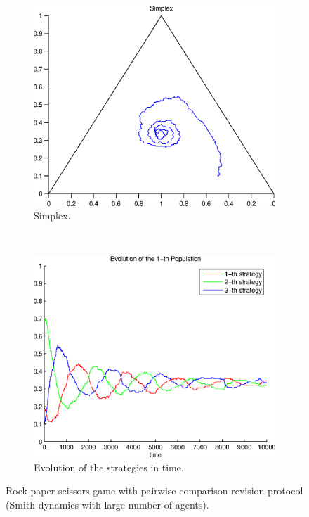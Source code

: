 \begin{figure}
  \centering
  \begin{subfigure}[b]{0.45\textwidth}
	  \includegraphics[width=\textwidth]{./images/test_finite_pairwise_comparison.eps}
	  \caption{Simplex.}
	  \label{fig:finite3_simplex}
  \end{subfigure}
  ~ 
  \begin{subfigure}[b]{0.45\textwidth}
	  \includegraphics[width=\textwidth]{./images/test_finite_pairwise_comparison_ev.eps}
	  \caption{Evolution of the strategies in time.}
	  \label{fig:finite3_ev}
  \end{subfigure}
  \caption{Rock-paper-scissors game with pairwise comparison revision protocol (Smith dynamics with large number of agents).}
  \label{fig:finite3}
\end{figure}


